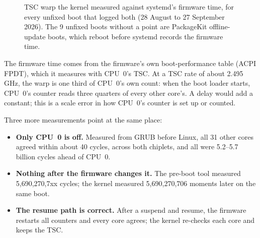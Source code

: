 \documentclass[11pt,a4paper]{article}
\begin{document}
\begin{figure}[ht]
\centering
{}
\caption{TSC warp the kernel measured against systemd's firmware time, for
every unfixed boot that logged both (28 August to 27 September 2026). The 9
unfixed boots without a point are PackageKit offline-update boots, which
reboot before systemd records the firmware time.}
\label{fig:warp}
\end{figure}

The firmware time comes from the firmware's own boot-performance table
(ACPI FPDT), which it measures with CPU~0's TSC. At a TSC rate of about
2.495\,GHz, the warp is one third of CPU~0's own count: when the boot loader
starts, CPU~0's counter reads three quarters of every other core's. A delay
would add a constant; this is a scale error in how CPU~0's counter is set up
or counted.

Three more measurements point at the same place:
\begin{itemize}
\item \textbf{Only CPU~0 is off.} Measured from GRUB before Linux, all 31
  other cores agreed within about 40 cycles, across both chiplets, and all
  were 5.2--5.7 billion cycles ahead of CPU~0.
\item \textbf{Nothing after the firmware changes it.} The pre-boot tool
  measured 5,690,270,7xx cycles; the kernel measured 5,690,270,706 moments
  later on the same boot.
\item \textbf{The resume path is correct.} After a suspend and resume, the
  firmware restarts all counters and every core agrees; the kernel re-checks
  each core and keeps the TSC.
\end{itemize}
\end{document}
